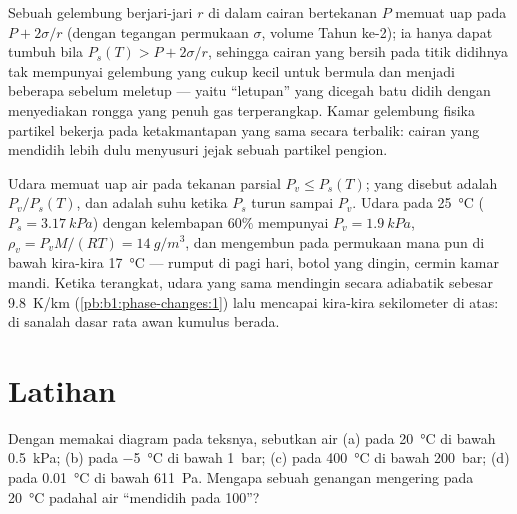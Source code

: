 \begin{remark}\label{rem:b1:phase-changes:nucleation}
Sebuah gelembung berjari-jari $r$ di dalam cairan bertekanan $P$ memuat uap pada
$P + 2\sigma/r$ (dengan tegangan permukaan $\sigma$, volume Tahun ke-2); ia hanya dapat
tumbuh bila $P_s(T) > P + 2\sigma/r$, sehingga cairan yang bersih pada titik didihnya
tak mempunyai gelembung yang cukup kecil untuk bermula dan menjadi  beberapa 
sebelum meletup --- yaitu ``letupan'' yang dicegah batu didih dengan
menyediakan rongga yang penuh gas terperangkap. Kamar gelembung fisika
partikel bekerja pada ketakmantapan yang sama secara terbalik: cairan yang 
mendidih lebih dulu menyusuri jejak sebuah partikel pengion.
\end{remark}

\begin{example}\label{ex:b1:phase-changes:dew}
Udara memuat uap air pada tekanan parsial $P_v \leq P_s(T)$; yang disebut
\emph{} adalah $P_v/P_s(T)$, dan \emph{} adalah
suhu ketika $P_s$ turun sampai $P_v$. Udara pada \qty{25}{\degreeCelsius}
($P_s = \qty{3.17}{kPa}$) dengan kelembapan $60\%$ mempunyai $P_v = \qty{1.9}{kPa}$,
$\rho_v = P_vM/(RT) = \qty{14}{g/m^3}$, dan mengembun pada permukaan mana pun di bawah
kira-kira \qty{17}{\degreeCelsius} --- rumput di pagi hari, botol yang dingin, cermin
kamar mandi. Ketika terangkat, udara yang sama mendingin secara adiabatik sebesar
\qty{9.8}{K/km} (\cref{pb:b1:phase-changes:1}) lalu mencapai  kira-kira
sekilometer di atas: di sanalah dasar rata awan kumulus berada.
\end{example}

\section{Latihan}

\begin{exercise}[$\star$]\label{exo:b1:phase-changes:1}
Dengan memakai diagram pada teksnya, sebutkan  air (a) pada
\qty{20}{\degreeCelsius} di bawah \qty{0.5}{kPa}; (b) pada \qty{-5}{\degreeCelsius}
di bawah \qty{1}{bar}; (c) pada \qty{400}{\degreeCelsius} di bawah \qty{200}{bar};
(d) pada \qty{0.01}{\degreeCelsius} di bawah \qty{611}{Pa}. Mengapa sebuah genangan mengering
pada \qty{20}{\degreeCelsius} padahal air ``mendidih pada 100''?
\end{exercise}


